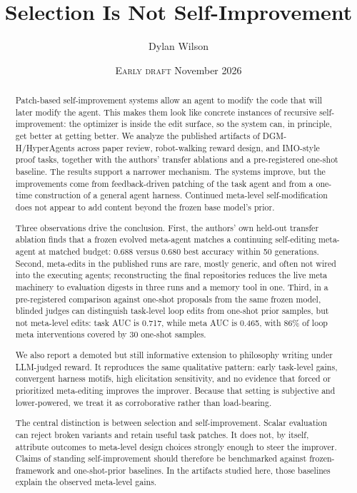 \documentclass[11pt]{article}
\title{\textbf{Selection Is Not Self-Improvement}}
\author{Dylan Wilson}
\date{\textcolor{red!60!black}{\textsc{Early draft}} \;\textperiodcentered\; November 2026}
\begin{document}
\maketitle
\begin{abstract}
Patch-based self-improvement systems allow an agent to modify the code that will later modify the agent. This makes them look like concrete instances of recursive self-improvement: the optimizer is inside the edit surface, so the system can, in principle, get better at getting better. We analyze the published artifacts of DGM-H/HyperAgents across paper review, robot-walking reward design, and IMO-style proof tasks, together with the authors' transfer ablations and a pre-registered one-shot baseline. The results support a narrower mechanism. The systems improve, but the improvements come from feedback-driven patching of the task agent and from a one-time construction of a general agent harness. Continued meta-level self-modification does not appear to add content beyond the frozen base model's prior.

Three observations drive the conclusion. First, the authors' own held-out transfer ablation finds that a frozen evolved meta-agent matches a continuing self-editing meta-agent at matched budget: 0.688 versus 0.680 best accuracy within 50 generations. Second, meta-edits in the published runs are rare, mostly generic, and often not wired into the executing agents; reconstructing the final repositories reduces the live meta machinery to evaluation digests in three runs and a memory tool in one. Third, in a pre-registered comparison against one-shot proposals from the same frozen model, blinded judges can distinguish task-level loop edits from one-shot prior samples, but not meta-level edits: task AUC is 0.717, while meta AUC is 0.465, with 86\% of loop meta interventions covered by 30 one-shot samples.

We also report a demoted but still informative extension to philosophy writing under LLM-judged reward. It reproduces the same qualitative pattern: early task-level gains, convergent harness motifs, high elicitation sensitivity, and no evidence that forced or prioritized meta-editing improves the improver. Because that setting is subjective and lower-powered, we treat it as corroborative rather than load-bearing.

The central distinction is between selection and self-improvement. Scalar evaluation can reject broken variants and retain useful task patches. It does not, by itself, attribute outcomes to meta-level design choices strongly enough to steer the improver. Claims of standing self-improvement should therefore be benchmarked against frozen-framework and one-shot-prior baselines. In the artifacts studied here, those baselines explain the observed meta-level gains.
\end{abstract}
\end{document}
